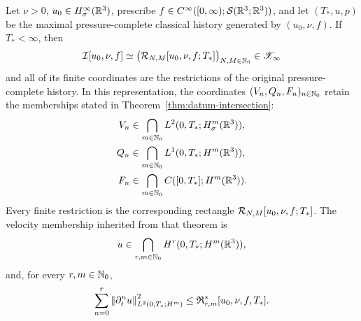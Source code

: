 \begin{theorem}
\label{thm:compatible-inverse-intersection}

Let \(\nu>0\), \(u_0\in H^\infty_\sigma(\mathbb R^3)\), prescribe
\(f\in C^\infty([0,\infty);\mathcal S(\mathbb R^3;\mathbb R^3))\), and let
\((T_*,u,p)\) be the maximal pressure-complete classical history generated
by \((u_0,\nu,f)\). If \(T_*<\infty\), then
\begin{equation}
 \mathcal I[u_0,\nu,f]
 \simeq\bigl(\mathcal R_{N,M}[u_0,\nu,f;T_*]\bigr)_{N,M\in\mathbb N_0}
 \in\mathscr X_\infty
 \label{eq:ier-compatible-family}
\end{equation}
and all of its finite coordinates are the restrictions of the original
pressure-complete history.  In this representation, the coordinates
\((V_n,Q_n,F_n)_{n\in\mathbb N_0}\) retain the memberships stated in
Theorem~\ref{thm:datum-intersection}:
\begin{align}
 V_n&\in\bigcap_{m\in\mathbb N_0}L^2(0,T_*;H^m_\sigma(\mathbb R^3)),
 \label{eq:ier-inverse-velocity-coordinate}\\
 Q_n&\in\bigcap_{m\in\mathbb N_0}L^1(0,T_*;H^m(\mathbb R^3)),
 \label{eq:ier-inverse-pressure-coordinate}\\
 F_n&\in\bigcap_{m\in\mathbb N_0}C([0,T_*];H^m(\mathbb R^3)).
 \label{eq:ier-inverse-force-coordinate}
\end{align}
Every finite restriction is the corresponding rectangle
\(\mathcal R_{N,M}[u_0,\nu,f;T_*]\).  The velocity membership inherited from that
theorem is
\begin{equation}
 u\in\bigcap_{r,m\in\mathbb N_0}H^r(0,T_*;H^m(\mathbb R^3)),
 \label{eq:mixed-sobolev-intersection}
\end{equation}
and, for every \(r,m\in\mathbb N_0\),
\begin{equation}
 \sum_{n=0}^{r}\left\lVert \partial_t^nu\right\rVert_{L^2(0,T_*;H^m)}^2
 \le\mathfrak R_{r,m}^*[u_0,\nu,f,T_*].
 \label{eq:mixed-sobolev-finite-bound}
\end{equation}
\end{theorem}

